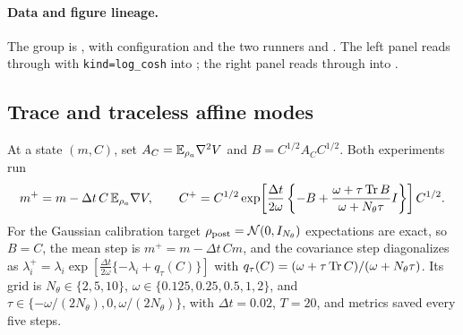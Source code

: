 \paragraph{Data and figure lineage.}
\begingroup\small\raggedright
The group is , with configuration
 and the two runners
 and . The left
panel reads
 through
 with \texttt{kind=log\_cosh} into
; the right panel reads
 through
 into
.
\par\endgroup

\subsection{Trace and traceless affine modes}

At a state $(m,C)$, set $A_C = \mathbb{E}_{\rho_a}\nabla^2V$ and $B = C^{1/2}A_CC^{1/2}$.
Both experiments run
\begin{equation}\label{eq:app-affine-step}
  m^+ = m - \Delta t\,C\,\mathbb{E}_{\rho_a}\nabla V,
  \qquad
  C^+ = C^{1/2}\exp\!\left[\frac{\Delta t}{2\omega}
    \left\{-B + \frac{\omega+\tau\operatorname{Tr} B}{\omega+N_\theta\tau}I\right\}\right]
    C^{1/2}.
\end{equation}
For the Gaussian calibration target $\rho_{\mathrm{post}} = \mathcal{N}(0,I_{N_\theta})$
expectations are exact, so $B = C$, the mean step is $m^+ = m-\Delta t\,Cm$, and
the covariance step diagonalizes as
$\lambda_i^+ = \lambda_i\exp[\frac{\Delta t}{2\omega}\{-\lambda_i+q_\tau(C)\}]$
with $q_\tau(C) = (\omega+\tau\operatorname{Tr} C)/(\omega+N_\theta\tau)$. Its grid is
$N_\theta\in\{2,5,10\}$, $\omega\in\{0.125,0.25,0.5,1,2\}$, and
$\tau\in\{-\omega/(2N_\theta),0,\omega/(2N_\theta)\}$, with $\Delta t = 0.02$,
$T = 20$, and metrics saved every five steps.

